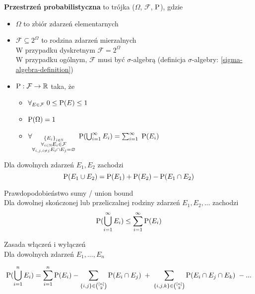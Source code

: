 \begin{definition}
	\textbf{Przestrzeń probabilistyczna} to trójka (\(\Omega\), \(\mathcal{F}\), \(\operatorname{P}\)), gdzie
	\begin{itemize}
		\item \(\Omega\) to zbiór zdarzeń elementarnych
		\item \(\mathcal{F} \subseteq 2^{\Omega}\) to rodzina zdarzeń mierzalnych\\
		W przypadku dyskretnym \(\mathcal{F} = 2^{\Omega}\)\\
		W przypadku ogólnym, \(\mathcal{F}\) musi być \(\sigma\)-algebrą (definicja \(\sigma\)-algebry: \ref{sigma-algebra-definition})
		\item \(\operatorname{P} : \mathcal{F} \to \mathbb{R}\) taka, że
		\begin{itemize}
			\item \(\forall_{E \in \mathcal{F}} \; 0 \leq \operatorname{P}(E) \leq 1\)
			\item \(\operatorname{P}(\Omega) = 1\)
			\item \(\forall_{\substack{\set{E_i}_{i \in \natural} \\ \forall_{i \in \natural} E_i \in \mathcal{F} \\ \forall_{i, j, i \not= j} E_i \cap E_j = \emptyset}} \; \prob(\bigcup_{i=1}^\infty E_i) = \sum_{i=1}^\infty \; \prob(E_i)\)
		\end{itemize}
	\end{itemize}
\end{definition}

\begin{lemma}
	Dla dowolnych zdarzeń \(E_1, E_2\) zachodzi
	\[
		\operatorname{P}(E_1 \cup E_2) = \operatorname{P}(E_1) + \operatorname{P}(E_2) - \operatorname{P}(E_1 \cap E_2)
	\]
\end{lemma} 

\begin{lemma} Prawdopodobieństwo sumy / union bound \\
	Dla dowolnej skończonej lub przeliczalnej rodziny zdarzeń \(E_1, E_2, ...\) zachodzi
	\[
		\operatorname{P}(\bigcup_{i=1}^\infty E_i) \leq \sum_{i=1}^\infty \operatorname{P}(E_i)
	\]
\end{lemma}

\begin{lemma} Zasada włączeń i wyłączeń \\
	Dla dowolnych zdarzeń \(E_1, ..., E_n\)
	
	\[
		\operatorname{P}(\bigcup_{i=1}^n E_i) = \sum_{i=1}^n \operatorname{P}(E_i) - \sum_{\{i,j\} \in \binom{[n]}{2}} \operatorname{P}(E_i \cap E_j) \; + \; \sum_{\{i,j,k\} \in \binom{[n]}{3}} \operatorname{P}(E_i \cap E_j \cap E_k) \; - ...
	\]
\end{lemma}

